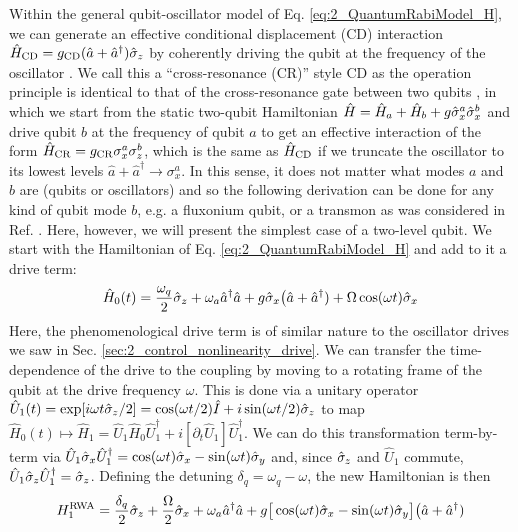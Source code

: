 Within the general qubit-oscillator model of Eq. \eqref{eq:2_QuantumRabiModel_H}, we can generate an effective conditional displacement (CD) interaction $\hat{H}_{\rm CD} = g_{\rm CD}(\hat{a} + \hat{a}^\dagger)\hat{\sigma}_z$ by coherently driving the qubit at the frequency of the oscillator \cite{touzard2019gated}. We call this a ``cross-resonance (CR)'' style CD as the operation principle is identical to that of the cross-resonance gate between two qubits \cite{rigetti2010fully}, in which we start from the static two-qubit Hamiltonian $\hat{H} = \hat{H}_a + \hat{H}_b + g\hat{\sigma}_x^a\hat{\sigma}_x^b$ and drive qubit $b$ at the frequency of qubit $a$ to get an effective interaction of the form  $\hat{H}_{\rm CR} = g_{\rm CR}\sigma_x^a\sigma_z^b$, which is the same as $\hat{H}_{\rm CD}$ if we truncate the oscillator to its lowest levels $\hat{a} + \hat{a}^\dagger \to \sigma_x^a$. In this sense, it does not matter what modes $a$ and $b$ are (qubits or oscillators) and so the following derivation can be done for any kind of qubit mode $b$, e.g. a fluxonium qubit, or a transmon as was considered in Ref. \cite{touzard2019gated}. Here, however, we will present the simplest case of a two-level qubit. We start with the Hamiltonian of Eq. \eqref{eq:2_QuantumRabiModel_H} and add to it a drive term:
\begin{equation}
\hat{H}_0(t) = \frac{\omega_q}{2}\hat{\sigma}_z + \omega_a \hat{a}^\dagger \hat{a} + g\hat{\sigma}_x\big(\hat{a} + \hat{a}^\dagger) + \Omega \cos(\omega t)\hat{\sigma}_x
\label{eq:CR_CR_initial_eq}
\end{equation}
Here, the phenomenological drive term is of similar nature to the oscillator drives we saw in Sec. \ref{sec:2_control_nonlinearity_drive}. We can transfer the time-dependence of the drive to the coupling by moving to a rotating frame of the qubit at the drive frequency $\omega$. This is done via a unitary operator $\hat{U}_1(t) = \exp[i\omega t \hat{\sigma}_z / 2] = \cos(\omega t/2)\hat{I} +i\sin(\omega t/2)\hat{\sigma}_z$ to map $\hat{H}_0(t) \mapsto \hat{H}_1 = \hat{U}_1\hat{H}_0\hat{U}_1^\dagger + i[\partial_t \hat{U}_1]\hat{U}_1^\dagger$. We can do this transformation term-by-term  via $\hat{U}_1\hat{\sigma}_x\hat{U}_1^\dagger = \cos(\omega t)\hat{\sigma}_x - \sin(\omega t)\hat{\sigma}_y$ and, since $\hat{\sigma}_z$ and $\hat{U}_1$ commute, $\hat{U}_1\hat{\sigma}_z\hat{U}_1^\dagger = \hat{\sigma}_z$. Defining the detuning $\delta_q = \omega_q - \omega$, the new Hamiltonian is then 
\begin{equation}
H_1^{\rm RWA} = \frac{\delta_q}{2}\hat{\sigma}_z + \frac{\Omega}{2}\hat{\sigma}_x + \omega_a \hat{a}^\dagger \hat{a} + g\big[\cos(\omega t)\hat{\sigma}_x - \sin(\omega t)\hat{\sigma}_y\big]\big(\hat{a} + \hat{a}^\dagger)
\end{equation}
